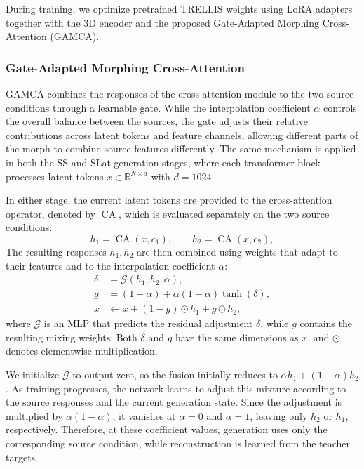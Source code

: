 During training, we optimize pretrained TRELLIS weights using LoRA adapters~\cite{hu2022lora} together with the 3D encoder and the proposed Gate-Adapted Morphing Cross-Attention (GAMCA).

\subsubsection{Gate-Adapted Morphing Cross-Attention}
\label{sec:attention_gating}
GAMCA combines the responses of the cross-attention module to the two source conditions through a learnable gate. While the interpolation coefficient $\alpha$ controls the overall balance between the sources, the gate adjusts their relative contributions across latent tokens and feature channels, allowing different parts of the morph to combine source features differently. The same mechanism is applied in both the SS and SLat generation stages, where each transformer block processes latent tokens $x\in\mathbb R^{N\times d}$ with $d=1024$.

In either stage, the current latent tokens are provided to the cross-attention operator, denoted by $\operatorname{CA}$, which is evaluated separately on the two source conditions:
\begin{equation}
 h_1=\operatorname{CA}(x,c_1),
\qquad
h_2=\operatorname{CA}(x,c_2),
\end{equation}
The resulting responses $h_1,h_2$ are then combined using weights that adapt to their features and to the interpolation coefficient $\alpha$:
\begin{equation}
 \begin{aligned}
  \delta &=\mathcal G(h_1,h_2,\alpha),\\
  g &=(1-\alpha)+\alpha(1-\alpha)\tanh(\delta),\\
  x &\leftarrow x+(1-g)\odot h_1+g\odot h_2,
 \end{aligned}
 \label{eq:attention_gate}
\end{equation}
where $\mathcal G$ is an MLP that predicts the residual adjustment $\delta$, while $g$ contains the resulting mixing weights. Both $\delta$ and $g$ have the same dimensions as $x$, and $\odot$ denotes elementwise multiplication.

We initialize $\mathcal G$ to output zero, so the fusion initially reduces to $\alpha h_1+(1-\alpha)h_2$. As training progresses, the network learns to adjust this mixture according to the source responses and the current generation state. Since the adjustment is multiplied by $\alpha(1-\alpha)$, it vanishes at $\alpha=0$ and $\alpha=1$, leaving only $h_2$ or $h_1$, respectively. Therefore, at these coefficient values, generation uses only the corresponding source condition, while reconstruction is learned from the teacher targets.
